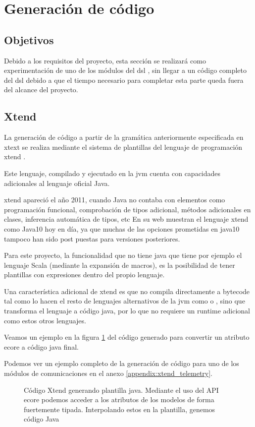 \section{Generación de código}

\subsection{Objetivos}

Debido a los requisitos del proyecto, esta sección se realizará como experimentación de uno de los módulos del \gls{dsl} , sin llegar a un código completo del \gls{dsl} debido a que el tiempo necesario para completar esta parte queda fuera del alcance del proyecto.

\subsection{Xtend}

La generación de código a partir de la gramática anteriormente especificada en \gls{xtext} se realiza mediante el sistema de plantillas del lenguaje de programación \gls{xtend} \cite{Xtend}.

Este lenguaje, compilado y ejecutado en la \gls{jvm} cuenta con capacidades adicionales al lenguaje oficial Java.

\gls{xtend} apareció el año 2011, cuando Java no contaba con elementos como programación funcional, comprobación de tipos adicional, métodos adicionales en clases, inferencia automática de tipos, etc En su web muestran el lenguaje \gls{xtend} como Java10 hoy en día, ya que muchas de las opciones prometidas en java10 tampoco han sido post puestas para versiones posteriores.

Para este proyecto, la funcionalidad que no tiene java que tiene por ejemplo el lenguaje Scala (mediante la expansión de macros), es la posibilidad de tener plantillas con expresiones dentro del propio lenguaje.

Una característica adicional de \gls{xtend} es que no compila directamente a \gls{bytecode} tal como lo hacen el resto de lenguajes alternativos de la \gls{jvm} como \textcite{Scala} o \textcite{Kotlin} , sino que transforma el lenguaje a código java, por lo que no requiere un \gls{runtime} adicional como estos otros lenguajes.


Veamos un ejemplo en la figura \ref{fig:ejemplo_xtend} del código generado para convertir un atributo \gls{ecore} a código java final. 

Podemos ver un ejemplo completo de la generación de código para uno de los módulos de comunicaciones en el anexo \ref{appendix:xtend_telemetry}.



\begin{figure}
	\centering
	
	
	
    \sourcepropia{}
    \caption[Código Xtend generando plantilla java]{Código Xtend generando plantilla java.  Mediante el uso del API \gls{ecore} podemos acceder a los atributos de los modelos de forma fuertemente tipada. Interpolando estos en la plantilla, genemos código Java}
    \label{fig:ejemplo_xtend}
\end{figure}
